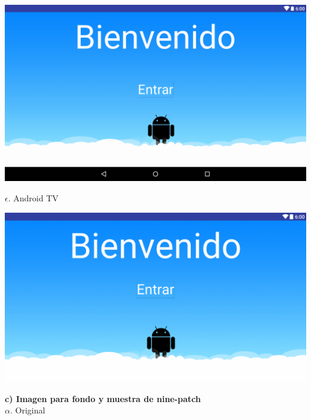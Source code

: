 \documentclass{article}
\begin{document}
\begin{center}

\includegraphics[scale=.25]{layout-2016-04-17-esp_tab_laylan.png} 

\end{center}

\newpage

$\epsilon$. Android TV

\begin{center}

\includegraphics[scale=.2]{layout-2016-04-17-esp_TV.png} 

\end{center}

\newpage

\noindent \textbf{c) Imagen para fondo y muestra de nine-patch}\\

$\alpha$. Original
\end{document}
